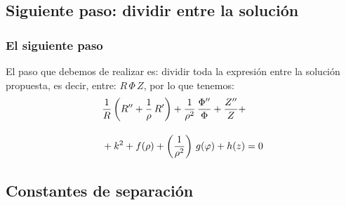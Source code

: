 \documentclass[12pt]{beamer}
\begin{document}
\subsection{Siguiente paso: dividir entre la solución}

\begin{frame}
\frametitle{El siguiente paso}
El paso que debemos de realizar es: dividir toda la expresión entre la solución propuesta, es decir, entre: $R \, \Phi \, Z$, por lo que tenemos:
\pause
\begin{align*}
&{} \dfrac{1}{R} \left( {R}^{\prime \prime} + \dfrac{1}{\rho} \, {R}^{\prime} \right) + \dfrac{1}{\rho^{2}} \, \dfrac{{\Phi}^{\prime \prime}}{\Phi} + \dfrac{{Z}^{\prime \prime}}{Z} + \\[1em]
&+ k^{2} + f(\rho) + \left( \dfrac{1}{\rho^{2}} \right) \, g(\varphi) + h(z) = 0    
\end{align*}
\end{frame}

\subsection{Constantes de separación}
\end{document}
